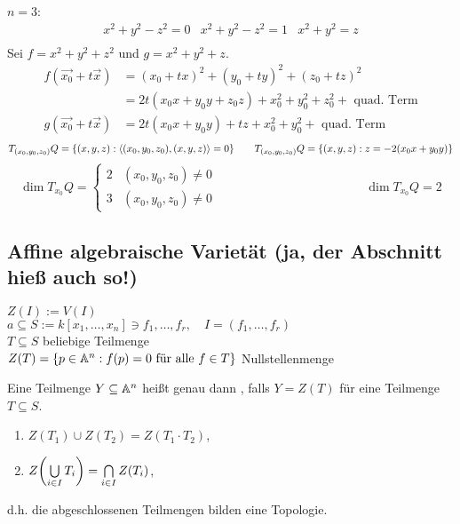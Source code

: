 \begin{bsp}
\begin{enumerate}[a)]
		$n = 3$: 
		\[\begin{array}{ccc}
			x^2+y^2-z^2 = 0 & x^2+y^2-z^2=1 & x^2+y^2=z \\ 
			&  &   
		\end{array} \]
		Sei $f = x^2+y^2+z^2$ und $g = x^2+y^2+z$. \\
		\begin{equation}
		\begin{aligned}
			f(\vec{x_0} + t\vec{x}) &= (x_0 + tx)^2 + (y_0 + ty)^2 + (z_0 + tz)^2 \\
			&= 2t(x_0x+y_0y+z_0z) + x_0^2 + y_0^2 + z_0^2 + \text{ quad. Term} \\
			g(\vec{x_0}+t\vec{x}) &= 2t(x_0x+y_0y)+tz+x_0^2+y_0^2+ \text{ quad. Term}
		\end{aligned}
		\end{equation}
		\[ T_{(x_0,y_0,z_0)}Q = \{ (x,y,z) : \langle(x_0,y_0,z_0),(x,y,z)\rangle = 0\} \qquad T_{(x_0,y_0,z_0)}Q = \{(x,y,z) : z = -2(x_0x + y_0y)\}\]
		\[ \dim T_{x_0}Q = \begin{cases}
			2 & (x_0,y_0,z_0) \neq 0 \\
			3 & (x_0,y_0,z_0) \neq 0
		\end{cases} \hspace{5cm}  \dim T_{x_0}Q = 2 \]
	\end{enumerate}
\end{bsp}
	
\subsection{Affine algebraische Varietät (ja, der Abschnitt hieß auch so!)}
\label{sub:abschnitt_1.2}
	$Z(I) := V(I)$		 \\
	$a \subseteq S := k[x_1,\dots,x_n] \ni f_1, \dots, f_r, \quad I = (f_1,\dots, f_r)$ \\
	$T \subseteq S$ beliebige Teilmenge \\
	$Z(T) = \{p \in \mathbb{A}^n : f(p) = 0 \text{ für alle } f \in T\}$ Nullstellenmenge
	
\begin{defn}
	Eine Teilmenge $Y \subseteq \mathbb{A}^n$ heißt genau dann , falls $Y = Z(T)$ für eine Teilmenge $T \subseteq S$. 
\end{defn}

\begin{satz}
	\begin{enumerate}[1)]
		\item $Z(T_1) \cup Z(T_2) = Z(T_1 \cdot T_2)$,
		\item $Z \enbrace*{\bigcup\limits_{i \in I} T_i} = \bigcap\limits_{i \in I} Z(T_i)$,
	\end{enumerate}
	d.h. die abgeschlossenen Teilmengen bilden eine Topologie.
\end{satz}

